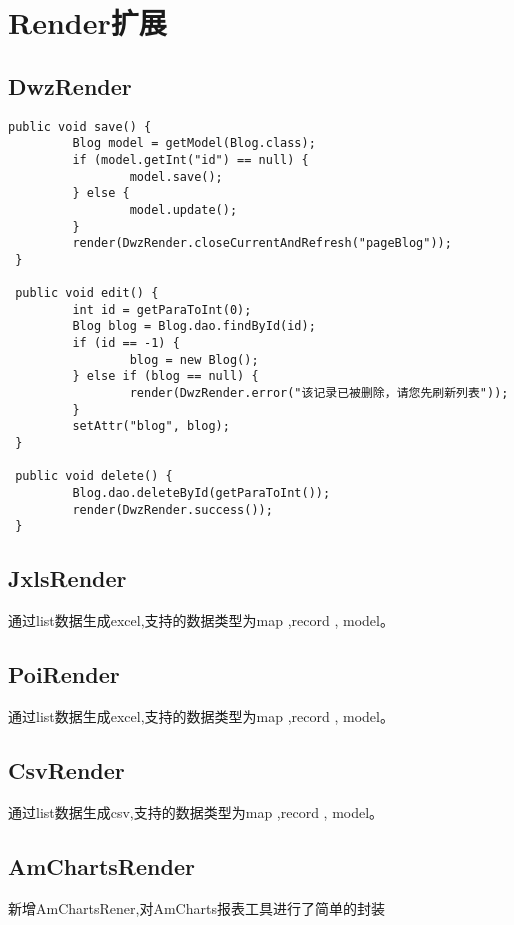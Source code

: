 \documentclass{scrartcl}
\begin{document}
\section{Render扩展}
\label{sec-3}
\subsection{DwzRender}
\label{sec-3-1}


\begin{verbatim}
public void save() {
         Blog model = getModel(Blog.class);
         if (model.getInt("id") == null) {
                 model.save();
         } else {
                 model.update();
         }
         render(DwzRender.closeCurrentAndRefresh("pageBlog"));
 }

 public void edit() {
         int id = getParaToInt(0);
         Blog blog = Blog.dao.findById(id);
         if (id == -1) {
                 blog = new Blog();
         } else if (blog == null) {
                 render(DwzRender.error("该记录已被删除，请您先刷新列表"));
         }
         setAttr("blog", blog);
 }

 public void delete() {
         Blog.dao.deleteById(getParaToInt());
         render(DwzRender.success());
 }
\end{verbatim}
\subsection{JxlsRender}
\label{sec-3-2}

   通过list数据生成excel,支持的数据类型为map ,record , model。
\subsection{PoiRender}
\label{sec-3-3}

   通过list数据生成excel,支持的数据类型为map ,record , model。
\subsection{CsvRender}
\label{sec-3-4}

   通过list数据生成csv,支持的数据类型为map ,record , model。
\subsection{AmChartsRender}
\label{sec-3-5}

新增AmChartsRener,对AmCharts报表工具进行了简单的封装
\end{document}
